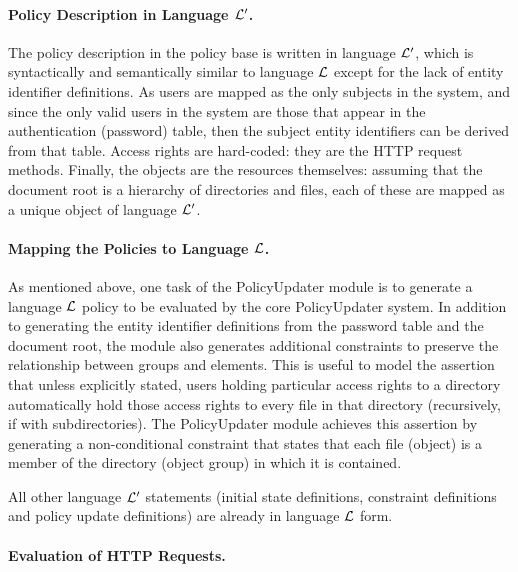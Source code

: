 \documentclass[11pt]{llncs}
\begin{document}
      \paragraph{\bf Policy Description in Language ${\cal L'}$.}

        The policy description in the policy base is written in language
        ${\cal L'}$, which is syntactically and semantically similar to
        language ${\cal L}$ except for the lack of entity identifier
        definitions. As users are mapped as the only subjects in the system,
        and since the only valid users in the system are those that appear in
        the authentication (password) table, then the subject entity
        identifiers can be derived from that table. Access rights are
        hard-coded: they are the HTTP request methods. Finally, the objects
        are the resources themselves: assuming that the document root is a
        hierarchy of directories and files, each of these are mapped as a
        unique object of language ${\cal L'}$.

      \paragraph{\bf Mapping the Policies to Language ${\cal L}$.}

        As mentioned above, one task of the PolicyUpdater module is to generate
        a language ${\cal L}$ policy to be evaluated by the core PolicyUpdater
        system. In addition to generating the entity identifier definitions
        from the password table and the document root, the module also
        generates additional constraints to preserve the relationship between
        groups and elements. This is useful to model the assertion that unless
        explicitly stated, users holding particular access rights to a
        directory automatically hold those access rights to every file in
        that directory (recursively, if with subdirectories). The PolicyUpdater
        module achieves this assertion by generating a non-conditional
        constraint that states that each file (object) is a member of the
        directory (object group) in which it is contained.

        All other language ${\cal L'}$ statements (initial state definitions,
        constraint definitions and policy update definitions) are already in
        language ${\cal L}$ form.

      \paragraph{\bf Evaluation of HTTP Requests.}
\end{document}
